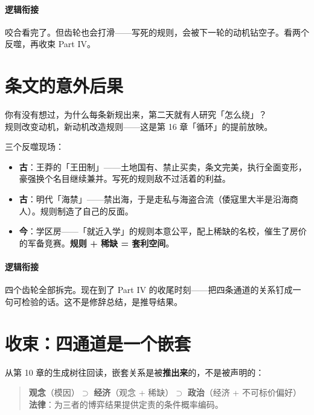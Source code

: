 \documentclass[../../main2.tex]{subfiles}
\begin{document}
\paragraph*{逻辑衔接}
	咬合看完了。但齿轮也会打滑——写死的规则，会被下一轮的动机钻空子。看两个反噬，再收束 Part IV。

\section{条文的意外后果}

\begin{readingnote}
	你有没有想过，为什么每条新规出来，第二天就有人研究「怎么绕」？\\
	规则改变动机，新动机改造规则——这是第 16 章「循环」的提前放映。
\end{readingnote}

三个反噬现场：

\begin{itemize}
	\item \textbf{古}：王莽的「王田制」——土地国有、禁止买卖，条文完美，执行全面变形，豪强换个名目继续兼并。写死的规则敌不过活着的利益。
	\item \textbf{古}：明代「海禁」——禁出海，于是走私与海盗合流（倭寇里大半是沿海商人）。规则制造了自己的反面。
	\item \textbf{今}：学区房——「就近入学」的规则本意公平，配上稀缺的名校，催生了房价的军备竞赛。\textbf{规则 + 稀缺 = 套利空间}。
\end{itemize}


\paragraph*{逻辑衔接}
	四个齿轮全部拆完。现在到了 Part IV 的收尾时刻——把四条通道的关系钉成一句可检验的话。这不是修辞总结，是推导结果。

\section{收束：四通道是一个嵌套}

从第 10 章的生成树往回读，嵌套关系是被\textbf{推出来}的，不是被声明的：

\begin{quote}
	\textbf{观念}（模因）$\supset$ \textbf{经济}（观念 + 稀缺）$\supset$ \textbf{政治}（经济 + 不可标价偏好）\\
	\textbf{法律}：为三者的博弈结果提供定责的条件概率编码。
\end{quote}
\end{document}

